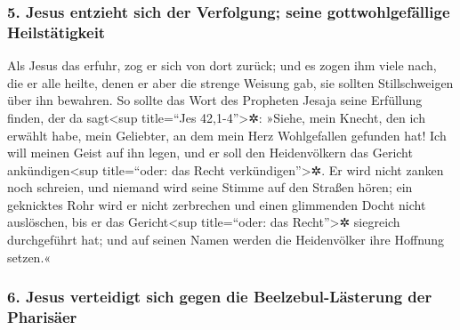 \hypertarget{jesus-entzieht-sich-der-verfolgung-seine-gottwohlgefuxe4llige-heilstuxe4tigkeit}{%
\subsubsection{5. Jesus entzieht sich der Verfolgung; seine
gottwohlgefällige
Heilstätigkeit}\label{jesus-entzieht-sich-der-verfolgung-seine-gottwohlgefuxe4llige-heilstuxe4tigkeit}}

 Als Jesus das erfuhr, zog er sich von dort zurück; und
es zogen ihm viele nach, die er alle heilte,  denen er
aber die strenge Weisung gab, sie sollten Stillschweigen über ihn
bewahren.  So sollte das Wort des Propheten Jesaja seine
Erfüllung finden, der da sagt\textless sup title=``Jes
42,1-4''\textgreater✲:  »Siehe, mein Knecht, den ich
erwählt habe, mein Geliebter, an dem mein Herz Wohlgefallen gefunden
hat! Ich will meinen Geist auf ihn legen, und er soll den Heidenvölkern
das Gericht ankündigen\textless sup title=``oder: das Recht
verkündigen''\textgreater✲.  Er wird nicht zanken noch
schreien, und niemand wird seine Stimme auf den Straßen hören;
 ein geknicktes Rohr wird er nicht zerbrechen und einen
glimmenden Docht nicht auslöschen, bis er das Gericht\textless sup
title=``oder: das Recht''\textgreater✲ siegreich durchgeführt hat;
 und auf seinen Namen werden die Heidenvölker ihre
Hoffnung setzen.«

\hypertarget{jesus-verteidigt-sich-gegen-die-beelzebul-luxe4sterung-der-pharisuxe4er}{%
\subsubsection{6. Jesus verteidigt sich gegen die Beelzebul-Lästerung
der
Pharisäer}\label{jesus-verteidigt-sich-gegen-die-beelzebul-luxe4sterung-der-pharisuxe4er}}

